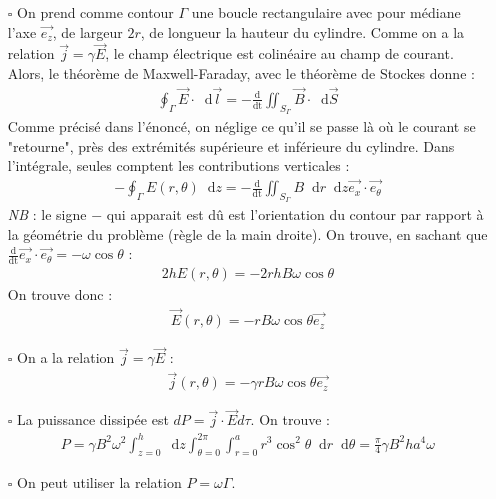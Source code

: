 \documentclass{report}
\newcommand*\dif{\mathop{}\!\mathrm{d}}
\begin{document}
\begin{itemize}
		\item[$\square$] On prend comme contour $\Gamma$ une boucle rectangulaire avec pour médiane l'axe $\vec{e_z}$, de largeur $2r$, de longueur la hauteur du cylindre. Comme on a la relation $\vec{j}=\gamma\vec{E}$, le champ électrique est colinéaire au champ de courant. Alors, le théorème de Maxwell-Faraday, avec le théorème de Stockes donne :
		\begin{align*}			
			\oint_\Gamma \vec{E}\cdot\dif\vec{l}=-\frac{\mathrm{d}}{\mathrm{dt}}\iint_{S_{\Gamma}}\vec{B}\cdot\dif\vec{S}	
		\end{align*}
		Comme précisé dans l'énoncé, on néglige ce qu'il se passe là où le courant se "retourne", près des extrémités supérieure et inférieure du cylindre. Dans l'intégrale, seules comptent les contributions verticales :
			\begin{align*}			
			-\oint_\Gamma E(r,\theta)\dif z=-\frac{\mathrm{d}}{\mathrm{dt}}\iint_{S_{\Gamma}}B\dif r\dif z\vec{e_x}\cdot\vec{e_\theta}	
		\end{align*}
		\textit{NB} : le signe $-$ qui apparait est dû est l'orientation du contour par rapport à la géométrie du problème (règle de la main droite).
		On trouve, en sachant que $\frac{\mathrm{d}}{\mathrm{dt}}\vec{e_x}\cdot\vec{e_\theta}=-\omega\cos\theta$ :
		\begin{align*}			
			2hE(r,\theta)=-2rhB\omega\cos\theta
		\end{align*}
		On trouve donc : 
		\begin{align*}			
			\vec{E}(r,\theta)=-rB\omega\cos\theta\vec{e_z}
		\end{align*}
		\item[$\square$] On a la relation $\vec{j}=\gamma\vec{E}$ :
		\begin{align*}			
			\vec{j}(r,\theta)=-\gamma rB\omega\cos\theta\vec{e_z}
		\end{align*}
		
		\item[$\square$] La puissance dissipée est $dP=\vec{j}\cdot\vec{E}d\tau$.
		On trouve :
		\begin{align*}
		P=\gamma B^2\omega^2\int_{z=0}^h \dif z\int_{\theta=0}^{2\pi}\int_{r=0}^{a}r^3\cos^2\theta\dif r\dif\theta=\frac{\pi}{4}\gamma B^2ha^4\omega
		\end{align*}
		
		\item[$\square$] On peut utiliser la relation $P=\omega\Gamma$.
		
\end{itemize}
\end{document}
